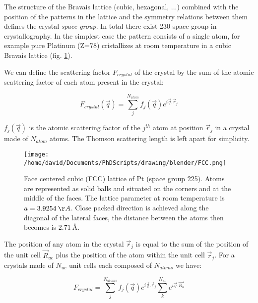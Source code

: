 The structure of the Bravais lattice (cubic, hexagonal, ...) combined with the position of the patterns in the lattice and the symmetry relations between them defines the crystal \textit{space group}.
In total there exist 230 space group in crystallography.
In the simplest case the pattern consists of a single atom, for example pure Platinum (Z=78) cristallizes at room temperature in a cubic Bravais lattice (fig. \ref{fig:fcc}).

We can define the scattering factor $F_{crystal}$ of the crystal by the sum of the atomic scattering factor of each atom present in the crystal: 

\begin{equation}
    F_{crystal}(\vec{q}) = \sum_j^{N_{atom}} f_j(\vec{q}) e^{i\vec{q}.\vec{r}_j}
\end{equation}

$f_j(\vec{q})$ is the atomic scattering factor of the $j^{th}$ atom at position $\vec{r}_j$ in a crystal made of $N_{atom}$ atoms.
The Thomson scattering length is left apart for simplicity.

\begin{figure}[!htb]
    \centering
    \texttt{[image: /home/david/Documents/PhDScripts/drawing/blender/FCC.png]}
    \caption{Face centered cubic (FCC) lattice of Pt (space group 225). Atoms are represented as solid balls and situated on the corners and at the middle of the faces. The lattice parameter at room temperature is $a = 3.9254 \:\AA$. Close packed direction is achieved along the diagonal of the lateral faces, the distance between the atoms then becomes is $2.71 \:\si{\angstrom}.$}
    \label{fig:fcc}
\end{figure}

The position of any atom in the crystal $\vec{r}_j$ is equal to the sum of the position of the unit cell $\vec{R}_{uc}$ plus the position of the atom within the unit cell $\vec{r}_j$.
For a crystals made of $N_{uc}$ unit cells each composed of $N_{atoms}$ we have:

\begin{equation}
    F_{crystal} = \sum_j^{N_{atoms}} f_j(\vec{q}) e^{i\vec{q}.\vec{r}_j} \sum_k^{N_{uc}} e^{i\vec{q}.\vec{R_k}}
    \label{eq:Fcrystal}
\end{equation}


